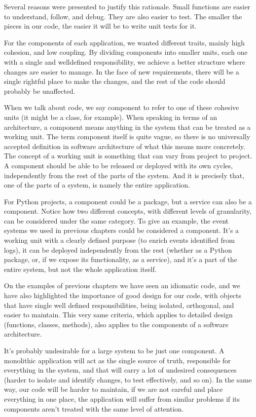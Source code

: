 \documentclass[a4paper,10pt,english]{sphinxmanual}
\begin{document}
Several reasons were presented to justify this rationale. Small functions are easier to
understand, follow, and debug. They are also easier to test. The smaller the pieces in our
code, the easier it will be to write unit tests for it.

For the components of each application, we wanted different traits, mainly high cohesion,
and low coupling. By dividing components into smaller units, each one with a single and
well\sphinxhyphen{}defined responsibility, we achieve a better structure where changes are easier to
manage. In the face of new requirements, there will be a single rightful place to make the
changes, and the rest of the code should probably be unaffected.

When we talk about code, we say component to refer to one of these cohesive units (it might
be a class, for example). When speaking in terms of an architecture, a component means
anything in the system that can be treated as a working unit. The term component itself is
quite vague, so there is no universally accepted definition in software architecture of what
this means more concretely. The concept of a working unit is something that can vary from
project to project. A component should be able to be released or deployed with its own
cycles, independently from the rest of the parts of the system. And it is precisely that, one of
the parts of a system, is namely the entire application.

For Python projects, a component could be a package, but a service can also be a
component. Notice how two different concepts, with different levels of granularity, can be
considered under the same category. To give an example, the event systems we used in
previous chapters could be considered a component. It’s a working unit with a clearly
defined purpose (to enrich events identified from logs), it can be deployed independently
from the rest (whether as a Python package, or, if we expose its functionality, as a service),
and it’s a part of the entire system, but not the whole application itself.

On the examples of previous chapters we have seen an idiomatic code, and we have also
highlighted the importance of good design for our code, with objects that have single well\sphinxhyphen{}
defined responsibilities, being isolated, orthogonal, and easier to maintain. This very same
criteria, which applies to detailed design (functions, classes, methods), also applies to the
components of a software architecture.

It’s probably undesirable for a large system to be just one component. A monolithic
application will act as the single source of truth, responsible for everything in the system,
and that will carry a lot of undesired consequences (harder to isolate and identify changes,
to test effectively, and so on). In the same way, our code will be harder to maintain, if we
are not careful and place everything in one place, the application will suffer from similar
problems if its components aren’t treated with the same level of attention.
\end{document}
